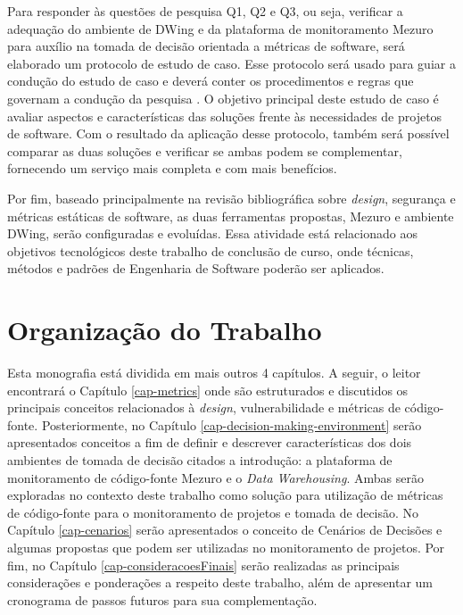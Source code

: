 Para responder às questões de pesquisa Q1, Q2 e Q3, ou seja, verificar a adequação do ambiente de DWing e da plataforma de monitoramento Mezuro para auxílio na tomada de decisão orientada a métricas de software, será elaborado um protocolo de estudo de caso.
%
Esse protocolo será usado para guiar a condução do estudo de caso e deverá conter os procedimentos e regras que governam a condução da pesquisa \cite{miles1994}.
%
O objetivo principal deste estudo de caso é avaliar aspectos e características das soluções frente às necessidades de projetos de software.
%
Com o resultado da aplicação desse protocolo, também será possível comparar as duas soluções e verificar se ambas podem se complementar, fornecendo um serviço mais completa e com mais benefícios.

Por fim, baseado principalmente na revisão bibliográfica sobre \emph{design}, segurança e métricas estáticas de software, as duas ferramentas propostas, Mezuro e ambiente DWing, serão configuradas e evoluídas.
%
Essa atividade está relacionado aos objetivos tecnológicos deste trabalho de conclusão de curso, onde técnicas, métodos e padrões de Engenharia de Software poderão ser aplicados.


\section{Organização do Trabalho}

Esta monografia está dividida em mais outros 4 capítulos. A seguir, o leitor encontrará o Capítulo \ref{cap-metrics} onde são estruturados e discutidos os principais conceitos relacionados à \emph{design}, vulnerabilidade e métricas de código-fonte. Posteriormente, no Capítulo \ref{cap-decision-making-environment} serão apresentados conceitos a fim de definir e descrever características dos dois ambientes de tomada de decisão citados a introdução: a plataforma de monitoramento de código-fonte Mezuro e o \emph{Data Warehousing}. Ambas serão exploradas no contexto deste trabalho como solução para utilização de métricas de código-fonte para o monitoramento de projetos e tomada de decisão. No Capítulo \ref{cap-cenarios} serão apresentados o conceito de Cenários de Decisões e algumas propostas que podem ser utilizadas no monitoramento de projetos. Por fim, no Capítulo \ref{cap-consideracoesFinais} serão realizadas as principais considerações e ponderações a respeito deste trabalho, além de apresentar um cronograma de passos futuros para sua complementação.

